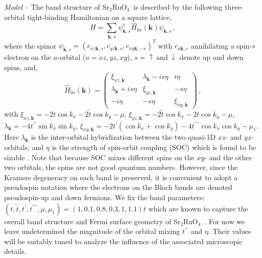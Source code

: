 \documentclass[aps,prl,twocolumn,superscriptaddress,showpacs]{revtex4-1}
\newcommand{\ua}{\uparrow}
\newcommand{\da}{\downarrow}
\newcommand{\bs}{\boldsymbol}
\newcommand{\SRO}{Sr$_2$RuO$_4$}
\begin{document}
{\it Model} -- The band structure of \SRO~is described by the following three-orbital tight-binding Hamiltonian on a square lattice,
\begin{equation}
H = \sum_{{\bs k},s} \psi^\dagger_{{\bs k},s} \hat{H}_{0s}({\bs k})\psi_{{\bs k},s} \,,
\label{eq:H0}
\end{equation}
where the spinor $\psi_{{\bs k},s} = (c_{xz{\bs k},s},c_{yz{\bs k},s},c_{xy{\bs k},-s})^T$ with $c_{a{\bs k},s}$ annihilating a spin-$s$ electron on the $a$-orbital ($a=xz,yz,xy$), $s=\ua~\text{and}~\da$ denote up and down spins, and,
\begin{equation}
\hat{H}_{0s}({\bs k}) = \begin{pmatrix}
\xi_{xz,\bs k}   &  \lambda_{\bs k} - is\eta  & i\eta  \\
\lambda_{\bs k} + is\eta  & \xi_{yz,\bs k}   &  -s\eta \\
-i\eta & -s\eta & \xi_{xy,\bs k}
\end{pmatrix} \,,
\label{eq:H0a}
\end{equation}
with $\xi_{xz,\bs k} = -2t \cos k_x -2 \tilde{t} \cos k_y -\mu$, $\xi_{yz,\bs k} = -2\tilde{t} \cos k_x -2 t \cos k_y-\mu$, $\lambda_{\bs k} = -4t^{\prime\prime} \sin k_x \sin k_y $, $\xi_{xy,\bs k} = -2t^\prime(\cos k_x + \cos k_y) -4t^{\prime\prime\prime} \cos k_x \cos k_y -\mu_1$. Here $\lambda_{\bs k}$ is the inter-orbital hybridization between the two quasi-1D $xz$- and $yz$-orbitals; and $\eta$ is the strength of spin-orbit coupling (SOC) which is found to be sizable \cite{Haverkort:08,Veenstra:14,Fatuzzo:15}. Note that because SOC mixes different spins on the $xy$- and the other two orbitals, the spins are not good quantum numbers. However, since the Kramers degeneracy on each band is preserved, it is convenient to adopt a pseudospin notation where the electrons on the Bloch bands are denoted pseudospin-up and down fermions. We fix the band parameters: $(t,\tilde{t},t^\prime,t^{\prime\prime\prime},\mu,\mu_1) = (1,0.1,0.8,0.3,1,1.1)t$ which are known to capture the overall band structure and Fermi surface geometry of \SRO~\cite{Damascelli:00,Bergemann:03,Bergemann:00}. For now we leave undetermined the magnitude of the orbital mixing $t^{\prime\prime}$ and $\eta$. Their values will be suitably tuned to analyze the influence of the associated microscopic details.
\end{document}
